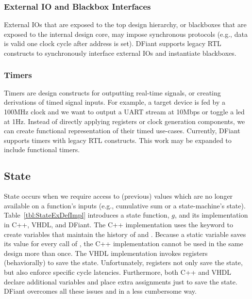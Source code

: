 \subsubsection{External IO and Blackbox Interfaces}
External IOs that are exposed to the top design hierarchy, or blackboxes that are exposed to the internal design core, may impose synchronous protocols (e.g., data is valid one clock cycle after address is set). DFiant supports legacy RTL constructs to synchronously interface external IOs and instantiate blackboxes. 
\subsubsection{Timers}
Timers are design constructs for outputting real-time signals, or creating derivations of timed signal inputs. For example, a target device is fed by a 100MHz clock and we want to output a UART stream at 10Mbps or toggle a led at 1Hz. Instead of directly applying registers or clock generation components, we can create functional representation of their timed use-cases. Currently, DFiant supports timers with legacy RTL constructs. This work may be expanded to include functional timers.

\subsection{State}
State occurs when we require access to (previous) values which are no longer available on a function's inputs (e.g., cumulative sum or a state-machine's state). Table~\ref{tbl:StateExDefImpl} introduces a state function, $g$, and its implementation in C++, VHDL, and DFiant. The C++ implementation uses the  keyword to create variables that maintain the history of  and . Because a static variable saves its value for every call of , the C++ implementation cannot be used in the same design more than once. The VHDL implementation invokes registers (behaviorally) to save the state. Unfortunately, registers not only save the state, but also enforce specific cycle latencies. Furthermore, both C++ and VHDL declare additional variables and place extra assignments just to save the state. DFiant overcomes all these issues and in a less cumbersome way.


